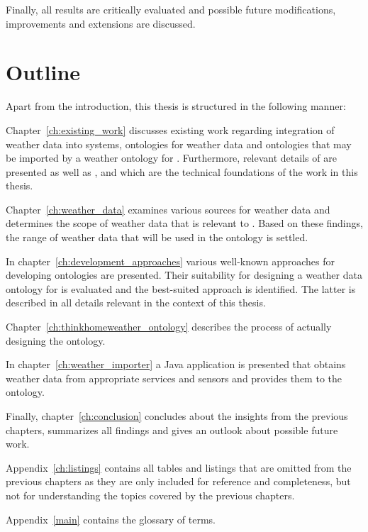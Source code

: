Finally, all results are critically evaluated and possible future modifications, improvements and extensions are discussed.

\section{Outline}

Apart from the introduction, this thesis is structured in the following manner:

Chapter~\ref{ch:existing_work} discusses existing work regarding integration of weather data into \smarthome systems, ontologies for weather data and ontologies that may be imported by a weather ontology for \thinkhome. Furthermore, relevant details of \thinkhome are presented as well as ,  and  which are the technical foundations of the work in this thesis.

Chapter~\ref{ch:weather_data} examines various sources for weather data and determines the scope of weather data that is relevant to \thinkhome. Based on these findings, the range of weather data that will be used in the ontology is settled.

In chapter~\ref{ch:development_approaches} various well-known approaches for developing ontologies are presented. Their suitability for designing a weather data ontology for \thinkhome is evaluated and the best-suited approach is identified. The latter is described in all details relevant in the context of this thesis.

Chapter~\ref{ch:thinkhomeweather_ontology} describes the process of actually designing the ontology.

In chapter~\ref{ch:weather_importer} a Java application is presented that obtains weather data from appropriate services and sensors and provides them to the \thinkhome ontology.

Finally, chapter~\ref{ch:conclusion} concludes about the insights from the previous chapters, summarizes all findings and gives an outlook about possible future work.

Appendix~\ref{ch:listings} contains all tables and listings that are omitted from the previous chapters as they are only included for reference and completeness, but not for understanding the topics covered by the previous chapters.

Appendix~\ref{main} contains the glossary of terms.
